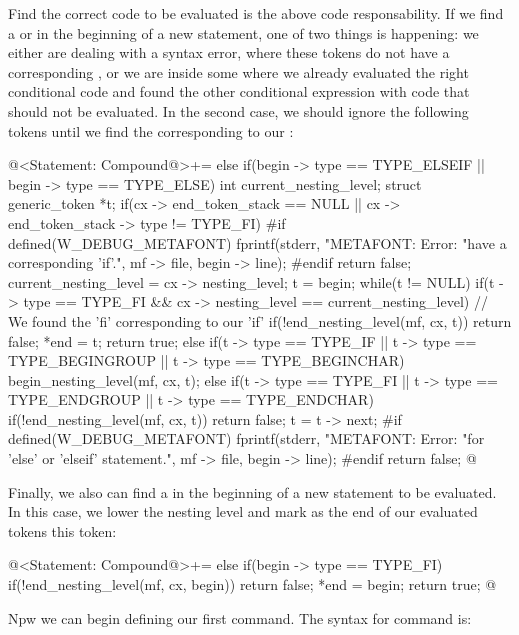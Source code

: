 {{{{{Find the correct code to be evaluated is the above code
responsability. If we find a  or 
in the beginning of a new statement, one of two things is happening:
we either are dealing with a syntax error, where these tokens do not
have a corresponding , or we are inside
some  where we already evaluated the right conditional
code and found the other conditional expression with code that should
not be evaluated. In the second case, we should ignore the following
tokens until we find the  corresponding to
our :

\iniciocodigo
@<Statement: Compound@>+=
else if(begin -> type == TYPE_ELSEIF || begin -> type == TYPE_ELSE){
  int current_nesting_level;
  struct generic_token *t;
  if(cx -> end_token_stack == NULL ||
     cx -> end_token_stack -> type != TYPE_FI){
#if defined(W_DEBUG_METAFONT)
  fprintf(stderr, "METAFONT: Error: %
          "have a corresponding 'if'.\n", mf -> file,
          begin -> line);
#endif  
    return false;
  }
  current_nesting_level = cx -> nesting_level;
  t = begin;
  while(t != NULL){
    if(t -> type == TYPE_FI && cx -> nesting_level == current_nesting_level){
      // We found the 'fi' corresponding to our 'if'
      if(!end_nesting_level(mf, cx, t))
        return false;
      *end = t;
      return true;
    }
    else if(t -> type == TYPE_IF || t -> type == TYPE_BEGINGROUP ||
            t -> type == TYPE_BEGINCHAR)
      begin_nesting_level(mf, cx, t);
    else if(t -> type == TYPE_FI || t -> type == TYPE_ENDGROUP ||
            t -> type == TYPE_ENDCHAR)
      if(!end_nesting_level(mf, cx, t))
        return false;
    t = t -> next;
  }
#if defined(W_DEBUG_METAFONT)
  fprintf(stderr, "METAFONT: Error: %
          "for 'else' or 'elseif' statement.\n", mf -> file,
          begin -> line);
#endif
  return false;
}
@
\fimcodigo

Finally, we also can find a  in the beginning of a new
statement to be evaluated. In this case, we lower the nesting level
and mark as the end of our evaluated tokens this 
token:

\iniciocodigo
@<Statement: Compound@>+=
else if(begin -> type == TYPE_FI){
  if(!end_nesting_level(mf, cx, begin))
    return false;
  *end = begin;
  return true;
}
@
\fimcodigo


Npw we can begin defining our first command. The syntax for
command  is:

}}}}}
